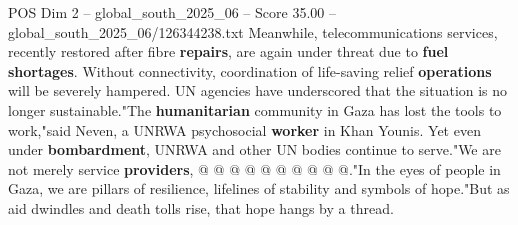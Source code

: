 \begin{textsample}{POS Dim 2 – global\_south\_2025\_06 – Score 35.00 – global\_south\_2025\_06/126344238.txt}
Meanwhile, telecommunications services, recently restored after fibre \textbf{repairs}, are again under threat due to \textbf{fuel} \textbf{shortages}.
Without connectivity, coordination of life-saving relief \textbf{operations} will be severely hampered.
UN agencies have underscored that the situation is no longer sustainable."The \textbf{humanitarian} community in Gaza has lost the tools to work,"said Neven, a UNRWA psychosocial \textbf{worker} in Khan Younis.
Yet even under \textbf{bombardment}, UNRWA and other UN bodies continue to serve."We are not merely service \textbf{providers}, @ @ @ @ @ @ @ @ @ @."In the eyes of people in Gaza, we are pillars of resilience, lifelines of stability and symbols of hope."But as aid dwindles and death tolls rise, that hope hangs by a thread.

\end{textsample}
